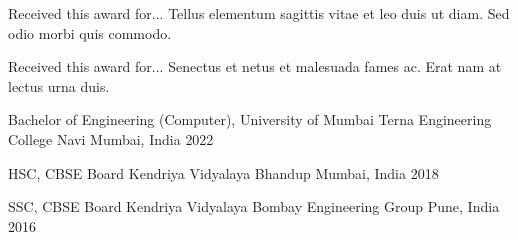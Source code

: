 \documentclass[10pt, a4paper]{cvhari}
\begin{document}
\medskip

    \bigskip
    
    {Received this award for... Tellus elementum sagittis vitae et leo duis ut diam. Sed odio morbi quis commodo.}\par
    
    \smallskip 
    \dividergray
    \smallskip
    
    {Received this award for... Senectus et netus et malesuada fames ac. Erat nam at lectus urna duis.}\par
    \medskip

\medskip


\medskip
    \education
        {Bachelor of Engineering (Computer), University of Mumbai}
        {Terna Engineering College}
        {Navi Mumbai, India}
        {2022}
        \par
        \dividergray
     
        \education
        {HSC, CBSE Board}
        {Kendriya Vidyalaya Bhandup}
        {Mumbai, India}
        {2018}

        \par
        \dividergray

        \education
        {SSC, CBSE Board}
        {Kendriya Vidyalaya Bombay Engineering Group}
        {Pune, India}
        {2016}

        \par
        \dividergray
\end{document}
